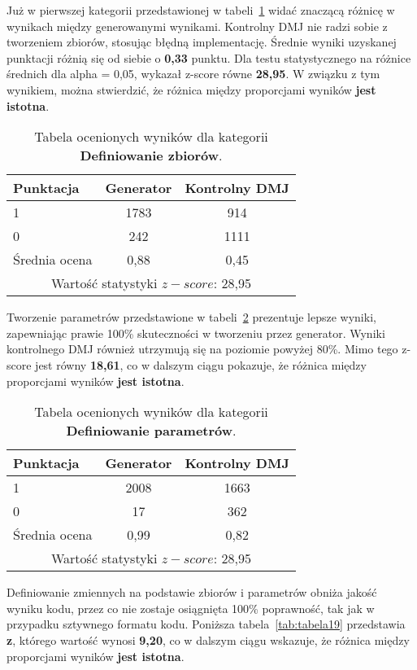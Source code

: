 Już w pierwszej kategorii przedstawionej w tabeli~\ref{tab:tabela17} widać znaczącą różnicę w wynikach między generowanymi wynikami. Kontrolny DMJ nie radzi sobie z tworzeniem zbiorów, stosując błędną implementację. Średnie wyniki uzyskanej punktacji różnią się od siebie o \textbf{0,33} punktu. Dla testu statystycznego na różnice średnich dla alpha = 0,05, wykazał z-score równe \textbf{28,95}. W związku z tym wynikiem, można stwierdzić, że różnica między proporcjami wyników \textbf{jest istotna}.

\begin{table}[H]
\caption{Tabela ocenionych wyników dla kategorii \textbf{Definiowanie zbiorów}.}\label{tab:tabela17}
\centering%
\begin{tabular}{|l|c|c|}
\hline
\textbf{Punktacja} & \textbf{Generator} & \textbf{Kontrolny DMJ}\\
\hline
1 & 1783 & 914 \\
\hline
0 & 242 & 1111 \\
\hline
Średnia ocena & 0,88 & 0,45 \\
\hline
\multicolumn{3}{|c|}{Wartość statystyki \( z-score \): 28,95} \\
\hline
\end{tabular}
\end{table}

Tworzenie parametrów przedstawione w tabeli~\ref{tab:tabela18} prezentuje lepsze wyniki, zapewniając prawie 100\% skuteczności w tworzeniu przez generator. Wyniki kontrolnego DMJ również utrzymują się na poziomie powyżej 80\%. Mimo tego z-score jest równy \textbf{18,61}, co w dalszym ciągu pokazuje, że różnica między proporcjami wyników \textbf{jest istotna}.

\begin{table}[H]
\caption{Tabela ocenionych wyników dla kategorii \textbf{Definiowanie parametrów}.}\label{tab:tabela18}
\centering%
\begin{tabular}{|l|c|c|}
\hline
\textbf{Punktacja} & \textbf{Generator} & \textbf{Kontrolny DMJ}\\
\hline
1 & 2008 & 1663 \\
\hline
0 & 17 & 362 \\
\hline
Średnia ocena & 0,99 & 0,82 \\
\hline
\multicolumn{3}{|c|}{Wartość statystyki \( z-score \): 28,95} \\
\hline
\end{tabular}
\end{table}

Definiowanie zmiennych na podstawie zbiorów i parametrów obniża jakość wyniku kodu, przez co nie zostaje osiągnięta 100\% poprawność, tak jak w przypadku sztywnego formatu kodu. Poniższa tabela~\ref{tab:tabela19} przedstawia \textbf{z}, którego wartość wynosi \textbf{9,20}, co w dalszym ciągu wskazuje, że różnica między proporcjami wyników \textbf{jest istotna}.

